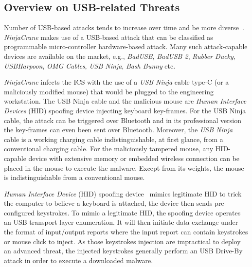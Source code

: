 \subsection{Overview on USB-related Threats}

Number of USB-based attacks tends to increase over time and be more diverse~\cite{Nissim17}. \emph{NinjaCrane} makes use of a USB-based attack that can be classified as programmable micro-controller hardware-based attack. Many such attack-capable devices are available on the market, e.g., \emph{BadUSB}, \emph{BadUSB 2}, \emph{Rubber Ducky}, \emph{USBHarpoon}, \emph{OMG Cables}, \emph{USB Ninja}, \emph{Bash Bunny} etc.

\emph{NinjaCrane} infects the ICS with the use of a \emph{USB Ninja} cable type-C (or a maliciously modified mouse) that would be plugged to the engineering workstation. The USB Ninja cable and the malicious mouse are \emph{Human Interface Devices} (HID) spoofing device injecting keyboard key-frames. For the USB Ninja cable, the attack can be triggered over Bluetooth and in its professional version the key-frames can even been sent over Bluetooth. Moreover, the \emph{USB Ninja} cable is a working charging cable indistinguishable, at first glance, from a conventional charging cable. For the maliciously tampered mouse, any HID-capable device with extensive memory or embedded wireless connection can be placed in the mouse to execute the malware. Except from its weights, the mouse is indistinguishable from a conventional mouse.

\emph{Human Interface Device} (HID) spoofing device~\cite{epstem1225679} mimics legitimate HID to trick the computer to believe a keyboard is attached, the device then sends pre-configured keystrokes. To mimic a legitimate HID, the spoofing device operates an USB transport layer enumeration. It will then initiate data exchange under the format of input/output reports where the input report can contain keystrokes or mouse click to inject. As those keystrokes injection are impractical to deploy an advanced threat, the injected keystrokes generally perform an USB Drive-By attack in order to execute a downloaded malware.
